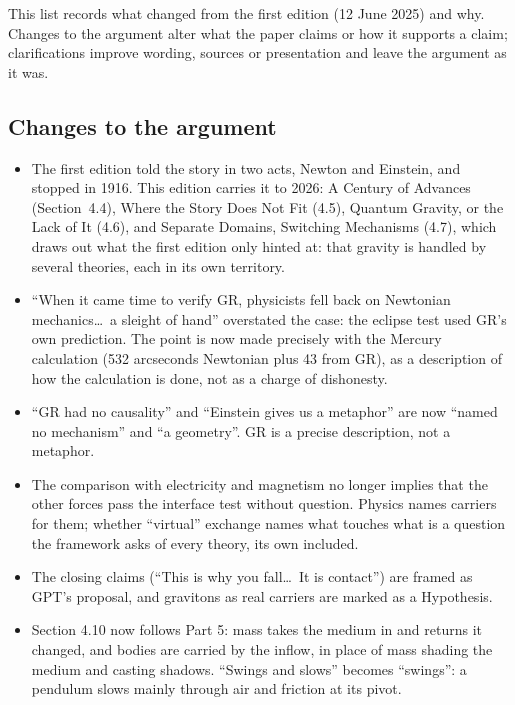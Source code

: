 \documentclass[11pt,a4paper]{article}
\begin{document}
This list records what changed from the first edition (12 June 2025) and why. Changes to the argument alter what the paper claims or how it supports a claim; clarifications improve wording, sources or presentation and leave the argument as it was.

\subsection*{Changes to the argument}
\begin{itemize}
  \item The first edition told the story in two acts, Newton and Einstein, and stopped in 1916. This edition carries it to 2026: A Century of Advances (Section~4.4), Where the Story Does Not Fit (4.5), Quantum Gravity, or the Lack of It (4.6), and Separate Domains, Switching Mechanisms (4.7), which draws out what the first edition only hinted at: that gravity is handled by several theories, each in its own territory.
  \item ``When it came time to verify GR, physicists fell back on Newtonian mechanics\ldots\ a sleight of hand'' overstated the case: the eclipse test used GR's own prediction. The point is now made precisely with the Mercury calculation (532 arcseconds Newtonian plus 43 from GR), as a description of how the calculation is done, not as a charge of dishonesty.
  \item ``GR had no causality'' and ``Einstein gives us a metaphor'' are now ``named no mechanism'' and ``a geometry''. GR is a precise description, not a metaphor.
  \item The comparison with electricity and magnetism no longer implies that the other forces pass the interface test without question. Physics names carriers for them; whether ``virtual'' exchange names what touches what is a question the framework asks of every theory, its own included.
  \item The closing claims (``This is why you fall\ldots\ It is contact'') are framed as GPT's proposal, and gravitons as real carriers are marked as a Hypothesis.
  \item Section 4.10 now follows Part 5: mass takes the medium in and returns it changed, and bodies are carried by the inflow, in place of mass shading the medium and casting shadows. ``Swings and slows'' becomes ``swings'': a pendulum slows mainly through air and friction at its pivot.
\end{itemize}
\end{document}
